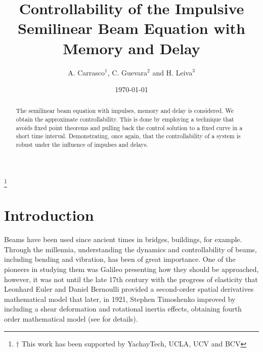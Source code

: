 \documentclass[11 pt]{amsart}
\begin{document}
\title[Controllability of the Semilinear Beam Equation]
{Controllability of the Impulsive Semilinear Beam Equation with Memory and Delay}
\date{\today}
\author[A. CARRASCO, C. GUEVARA  AND H. LEIVA ]{A. Carrasco$^1$, C. Guevara$^2$ and H. Leiva$^3$  }
\address{$^{1}$ Universidad Centroccidental Lisandro Alvarado \\
          Decanato de Ciencias y Tecnologia, Departamento de Matem\'aticas \\
          Barquisimeto 3001-Venezuela}
\address{$^{2}$ Louisiana State University \\
          College of Science, Department of Mathematics \\
          Baton Rouge, LA 70803-USA} 
\address{$^{3}$ School of Mathematical Sciences and Information Technology, \\
           Universidad Yachay Tech, \\
         San Miguel de Urcuqui, Ecuador}

\thanks{$\dagger$ This work has been supported by YachayTech, UCLA, UCV and BCV}
 

\begin{abstract}
The semilinear beam equation with impulses, memory and delay is considered. We obtain the approximate controllability. This is done by employing a technique that avoids fixed point theorems and pulling back the control solution to a fixed curve in a short time interval. Demonstrating, once again, that  the controllability of a system is robust under the influence of impulses and delays.

\end{abstract}

\maketitle 

\section{Introduction}

Beams have been used since ancient times in bridges, buildings, for example. Through the millennia, understanding the dynamics and controllability of beams, including bending and vibration, has been  of great importance. One of the pioneers  in studying them was Galileo presenting how they should be approached,  however, it was not until the late 17th century with the progress of elasticity that  Leonhard Euler and Daniel Bernoulli provided  a second-order spatial derivatives mathematical model that later, in 1921, Stephen Timoshenko improved by including a shear deformation and rotational inertia effects, obtaining  fourth order  mathematical model (see \cite{Timoshenko:1921aa,Timoshenko:1922aa, Timoshenko:1953aa} for  details).
\end{document}
